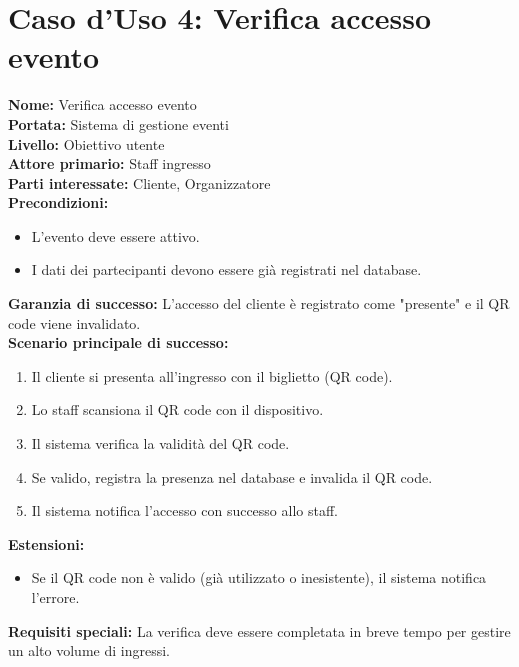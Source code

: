 \documentclass[a4paper,12pt]{article}
\begin{document}
\section*{\textcolor{sectioncolor}{Caso d'Uso 4: Verifica accesso evento}}
\textcolor{textcolor}{
\textbf{Nome:} Verifica accesso evento\\
\textbf{Portata:} Sistema di gestione eventi\\
\textbf{Livello:} Obiettivo utente\\
\textbf{Attore primario:} Staff ingresso\\
\textbf{Parti interessate:} Cliente, Organizzatore\\
\textbf{Precondizioni:}
\begin{itemize}
    \item L'evento deve essere attivo.
    \item I dati dei partecipanti devono essere già registrati nel database.
\end{itemize}
\textbf{Garanzia di successo:} L'accesso del cliente è registrato come "presente" e il QR code viene invalidato.\\
\textbf{Scenario principale di successo:}
\begin{enumerate}
    \item Il cliente si presenta all'ingresso con il biglietto (QR code).
    \item Lo staff scansiona il QR code con il dispositivo.
    \item Il sistema verifica la validità del QR code.
    \item Se valido, registra la presenza nel database e invalida il QR code.
    \item Il sistema notifica l'accesso con successo allo staff.
\end{enumerate}
\textbf{Estensioni:}
\begin{itemize}
    \item Se il QR code non è valido (già utilizzato o inesistente), il sistema notifica l'errore.
\end{itemize}
\textbf{Requisiti speciali:} La verifica deve essere completata in breve tempo per gestire un alto volume di ingressi.
}
\end{document}
